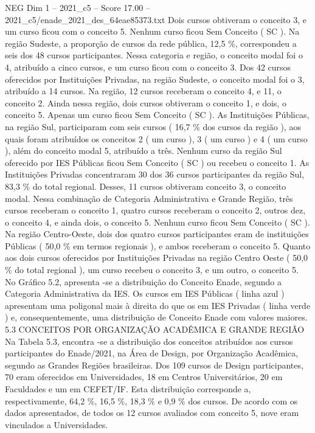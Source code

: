 \begin{textsample}{NEG Dim 1 – 2021\_c5 – Score 17.00 – 2021\_c5/enade\_2021\_des\_64eae85373.txt}
Dois cursos obtiveram o conceito 3, e um curso ficou com o conceito 5.
Nenhum curso ficou Sem Conceito ( SC ).
Na região Sudeste, a proporção de cursos da rede pública, 12,5 \%, correspondeu a seis dos 48 cursos participantes.
Nessa categoria e região, o conceito modal foi o 4, atribuído a cinco cursos, e um curso ficou com o conceito 3.
Dos 42 cursos oferecidos por Instituições Privadas, na região Sudeste, o conceito modal foi o 3, atribuído a 14 cursos.
Na região, 12 cursos receberam o conceito 4, e 11, o conceito 2.
Ainda nessa região, dois cursos obtiveram o conceito 1, e dois, o conceito 5.
Apenas um curso ficou Sem Conceito ( SC ).
As Instituições Públicas, na região Sul, participaram com seis cursos ( 16,7 \% dos cursos da região ), aos quais foram atribuídos os conceitos 2 ( um curso ), 3 ( um curso ) e 4 ( um curso ), além do conceito modal 5, atribuído a três.
Nenhum curso da região Sul oferecido por IES Públicas ficou Sem Conceito ( SC ) ou recebeu o conceito 1.
As Instituições Privadas concentraram 30 dos 36 cursos participantes da região Sul, 83,3 \% do total regional.
Desses, 11 cursos obtiveram conceito 3, o conceito modal.
Nessa combinação de Categoria Administrativa e Grande Região, três cursos receberam o conceito 1, quatro cursos receberam o conceito 2, outros dez, o conceito 4, e ainda dois, o conceito 5.
Nenhum curso ficou Sem Conceito ( SC ).
Na região Centro-Oeste, dois dos quatro cursos participantes eram de instituições Públicas ( 50,0 \% em termos regionais ), e ambos receberam o conceito 5.
Quanto aos dois cursos oferecidos por Instituições Privadas na região Centro Oeste ( 50,0 \% do total regional ), um curso recebeu o conceito 3, e um outro, o conceito 5.
No Gráfico 5.2, apresenta -se a distribuição do Conceito Enade, segundo a Categoria Administrativa da IES.
Os cursos em IES Públicas ( linha azul ) apresentam uma poligonal mais à direita do que os em IES Privadas ( linha verde ) e, consequentemente, uma distribuição de Conceito Enade com valores maiores. 5.3 CONCEITOS POR ORGANIZAÇÃO ACADÊMICA E GRANDE REGIÃO Na Tabela 5.3, encontra -se a distribuição dos conceitos atribuídos aos cursos participantes do Enade/2021, na Área de Design, por Organização Acadêmica, segundo as Grandes Regiões brasileiras.
Dos 109 cursos de Design participantes, 70 eram oferecidos em Universidades, 18 em Centros Universitários, 20 em Faculdades e um em CEFET/IF.
Esta distribuição corresponde a, respectivamente, 64,2 \%, 16,5 \%, 18,3 \% e 0,9 \% dos cursos.
De acordo com os dados apresentados, de todos os 12 cursos avaliados com conceito 5, nove eram vinculados a Universidades.

\end{textsample}
